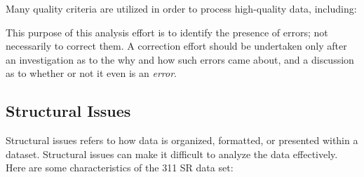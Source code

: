 \documentclass[linenumber]{jdsart}
\begin{document}
Many quality criteria are utilized in order to process high-quality 
data, including:

This purpose of this analysis effort is to identify the presence of 
errors; not necessarily to correct them. A correction effort should
be undertaken only after an investigation as to the why and how 
such errors came about, and a discussion as to whether or not it 
even is an \textit{error}. 


\subsection{Structural Issues}
\label{sec:structural}
Structural issues refers to how data is organized, formatted, 
or presented within a dataset. Structural issues can make 
it difficult to analyze the data effectively. Here are some 
characteristics of the 311 SR data set:
\end{document}
